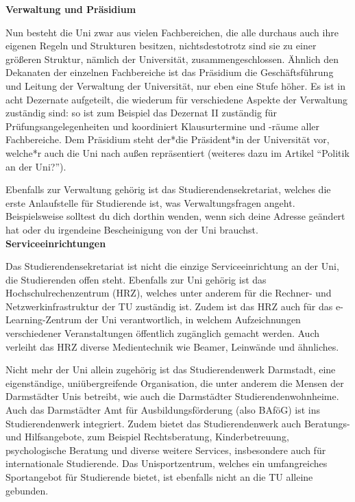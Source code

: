 {    \textbf{Verwaltung und Präsidium}

    Nun besteht die Uni zwar aus vielen Fachbereichen, die alle durchaus auch ihre eigenen Regeln und Strukturen besitzen, nichtsdestotrotz sind sie zu einer größeren Struktur, nämlich der Universität, zusammengeschlossen. Ähnlich den Dekanaten der einzelnen Fachbereiche ist das Präsidium die Geschäftsführung und Leitung der Verwaltung der Universität, nur eben eine Stufe höher. Es ist in acht Dezernate aufgeteilt, die wiederum für verschiedene Aspekte der Verwaltung zuständig sind: so ist zum Beispiel das Dezernat II zuständig für Prüfungsangelegenheiten und koordiniert Klausurtermine und -räume aller Fachbereiche. Dem Präsidium steht der*die Präsident*in der Universität vor, welche*r auch die Uni nach außen repräsentiert (weiteres dazu im Artikel "`Politik an der Uni?"').

    Ebenfalls zur Verwaltung gehörig ist das Studierendensekretariat, welches die erste Anlaufstelle für Studierende ist, was Verwaltungsfragen angeht. Beispielsweise solltest du dich dorthin wenden, wenn sich deine Adresse geändert hat oder du irgendeine Bescheinigung von der Uni brauchst.\\

    \textbf{Serviceeinrichtungen}

    Das Studierendensekretariat ist nicht die einzige Serviceeinrichtung an der Uni, die Studierenden offen steht. Ebenfalls zur Uni gehörig ist das Hochschulrechenzentrum (HRZ), welches unter anderem für die Rechner- und Netzwerkinfrastruktur der TU zuständig ist. Zudem ist das HRZ auch für das e-Learning-Zentrum der Uni verantwortlich, in welchem Aufzeichnungen verschiedener Veranstaltungen öffentlich zugänglich gemacht werden. Auch verleiht das HRZ diverse Medientechnik wie Beamer, Leinwände und ähnliches.

    Nicht mehr der Uni allein zugehörig ist das Studierendenwerk Darmstadt, eine eigenständige, uniübergreifende Organisation, die unter anderem die Mensen der Darmstädter Unis betreibt, wie auch die Darmstädter Studierendenwohnheime. Auch das Darmstädter Amt für Ausbildungsförderung (also BAföG) ist ins Studierendenwerk integriert. Zudem bietet das Studierendenwerk auch Beratungs- und Hilfsangebote, zum Beispiel Rechtsberatung, Kinderbetreuung, psychologische Beratung und diverse weitere Services, insbesondere auch für internationale Studierende. Das Unisportzentrum, welches ein umfangreiches Sportangebot für Studierende bietet, ist ebenfalls nicht an die TU alleine gebunden.

}

